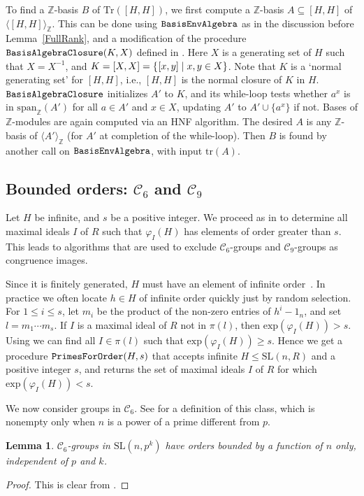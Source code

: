 \documentclass[11pt]{amsart}
\newtheorem{lemma}[theorem]{Lemma}
\theoremstyle{definition}
\theoremstyle{remark}
\newcommand{\Z}{\mathbb{Z}}
\newcommand{\SL}{\mathrm{SL}}
\newcommand{\tr}{\mathrm{tr}}
\newcommand{\calc}{\mathscr{C}}
\begin{document}
To find a $\Z$-basis $B$ of $\mathrm{Tr}([H,H])$, we first compute 
a $\Z$-basis $A\subseteq [H,H]$ of $\langle [H,H]\rangle_\Z$. 
This can be done using $\tt BasisEnvAlgebra$ as in the 
discussion before Lemma~\ref{FullRank}, and a modification of the 
procedure ${\tt BasisAlgebraClosure}(K,X)$ defined in 
\cite[Section~3]{TitsDFO}.
Here $X$ is a generating set of $H$ such that $X= X^{-1}$, and 
$K=[X,X]=\{ \hspace{.5pt} [x,y] \mid x,y\in X\}$. Note that $K$  
is a `normal generating set' for $[H,H]$, i.e., $[H,H]$ is the 
normal closure of $K$ in $H$. $\tt BasisAlgebraClosure$ 
initializes $A'$ to $K$, and its while-loop tests whether 
$a^x$ is in $\mathrm{span}_\Z(A')$ for all $a\in A'$ and $x\in X$, 
updating $A'$ to $A'\cup\{a^x\}$ if not.
Bases of $\Z$-modules are again computed via an HNF algorithm. The 
desired $A$ is any $\Z$-basis of $\langle A'\rangle_{\Z}$ 
(for $A'$ at completion of the while-loop). Then $B$ is found by 
another call on $\tt BasisEnvAlgebra$, with input $\tr(A)$.

\subsection{Bounded orders: $\calc_6$ and $\calc_9$} 
\label{class6}

Let $H$ be infinite, and $s$ be a positive integer. 
We proceed as in \cite[Section~2.1]{ExpMath} to determine all 
maximal ideals $I$ of $R$ such that $\varphi_I(H)$ has elements 
of order greater than $s$.
This leads to algorithms that are used to exclude $\calc_6$-groups 
and $\calc_9$-groups as congruence images.

Since it is finitely generated, $H$ must have an element  
of infinite order~\cite[4.9]{Wehrfritz}. In practice we often 
locate $h\in H$ of infinite order quickly just by random 
selection. For $1 \leq i \leq s$, let $m_i$ be the product of 
the non-zero entries of $h^i-1_n$, and set $l=m_1\cdots m_s$.
If $I$ is a maximal ideal of $R$ not in $\pi(l)$, then 
$\mathrm{exp}(\varphi_I(H))>s$. Using \cite{NSrecog} 
we can find all $I \in \pi(l)$ such that 
$\mathrm{exp}(\varphi_I(H)) \geq s$. Hence we get a procedure 
${\tt PrimesForOrder}(H, s)$ that accepts infinite $H\leq \SL(n, R)$
and a positive integer $s$, and returns the set of maximal ideals 
$I$ of $R$ for which $\mathrm{exp}(\varphi_I(H)) < s$.

We now consider groups in $\calc_6$. See \cite[Section~2.2.6]{Brayetal} 
for a definition of this class, which is nonempty only when $n$ is a 
power of a prime different from $p$.
\begin{lemma} 
\label{Cee6}
$\calc_6$-groups in $\SL(n, p^k)$ have orders bounded by a function of $n$ 
only, independent of $p$ and $k$.
\end{lemma}
\begin{proof}
This is clear from \cite[Table~2.9]{Brayetal}. 
\end{proof}
\end{document}
